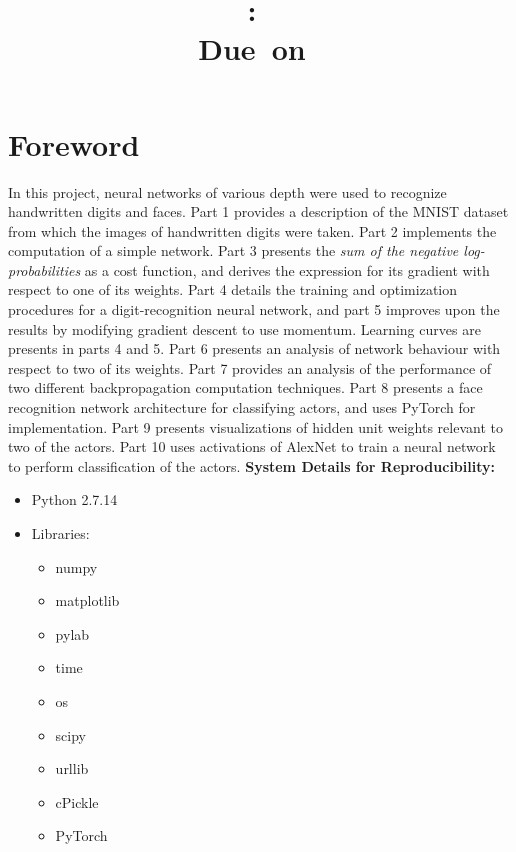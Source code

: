 \documentclass{article}
\title{
\vspace{2in}
\textmd{\textbf{\hmwkClass:\ \hmwkTitle}}\\
\normalsize\vspace{0.1in}\small{Due\ on\ \hmwkDueDate}\\
\vspace{0.1in}
\vspace{3in}
}
\author{\textbf{\hmwkAuthorName}}
\begin{document}
\maketitle
\clearpage
\clearpage
\section{Foreword}
In this project, neural networks of various depth were used to recognize handwritten digits and faces.
\newline
\newline
Part 1 provides a description of the MNIST dataset from which the images of handwritten digits were taken. Part 2 implements the computation of a simple network. Part 3 presents the \textit{sum of the negative log-probabilities} as a cost function, and derives the expression for its gradient with respect to one of its weights. Part 4 details the training and optimization procedures for a digit-recognition neural network, and part 5 improves upon the results by modifying gradient descent to use momentum. Learning curves are presents in parts 4 and 5. Part 6 presents an analysis of network behaviour with respect to two of its weights. Part 7 provides an analysis of the performance of two different backpropagation computation techniques. Part 8 presents a face recognition network architecture for classifying actors, and uses PyTorch for implementation. Part 9 presents visualizations of hidden unit weights relevant to two of the actors. Part 10 uses activations of AlexNet to train a neural network to perform classification of the actors.
\newline
\newline
\textbf{System Details for Reproducibility:}
\begin{itemize}
	\item Python 2.7.14
	\item Libraries:
	\begin{itemize}
		\item numpy
		\item matplotlib
		\item pylab
		\item time
		\item os
		\item scipy
		\item urllib
		\item cPickle
		\item PyTorch
	\end{itemize}
\end{itemize}
\clearpage
\end{document}
